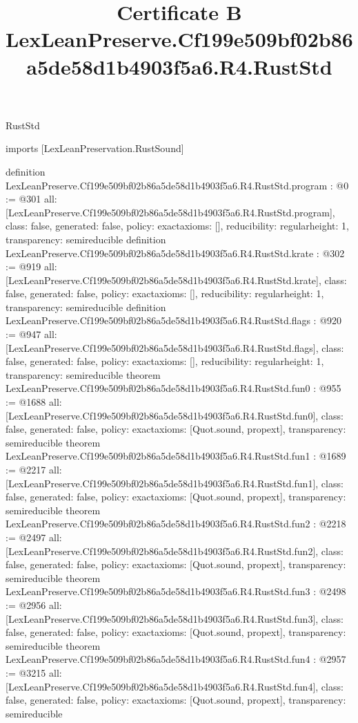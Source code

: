 \begin{lexlean}{RustStd}
\title{Certificate B LexLeanPreserve.Cf199e509bf02b86a5de58d1b4903f5a6.R4.RustStd}
\begin{coremodule}
imports [LexLeanPreservation.RustSound]

definition LexLeanPreserve.Cf199e509bf02b86a5de58d1b4903f5a6.R4.RustStd.program : @0 := @301 {
  all: [LexLeanPreserve.Cf199e509bf02b86a5de58d1b4903f5a6.R4.RustStd.program],
  class: false,
  generated: false,
  policy: exact{axioms: []},
  reducibility: regular{height: 1},
  transparency: semireducible
}
definition LexLeanPreserve.Cf199e509bf02b86a5de58d1b4903f5a6.R4.RustStd.krate : @302 := @919 {
  all: [LexLeanPreserve.Cf199e509bf02b86a5de58d1b4903f5a6.R4.RustStd.krate],
  class: false,
  generated: false,
  policy: exact{axioms: []},
  reducibility: regular{height: 1},
  transparency: semireducible
}
definition LexLeanPreserve.Cf199e509bf02b86a5de58d1b4903f5a6.R4.RustStd.flags : @920 := @947 {
  all: [LexLeanPreserve.Cf199e509bf02b86a5de58d1b4903f5a6.R4.RustStd.flags],
  class: false,
  generated: false,
  policy: exact{axioms: []},
  reducibility: regular{height: 1},
  transparency: semireducible
}
theorem LexLeanPreserve.Cf199e509bf02b86a5de58d1b4903f5a6.R4.RustStd.fun0 : @955 := @1688 {
  all: [LexLeanPreserve.Cf199e509bf02b86a5de58d1b4903f5a6.R4.RustStd.fun0],
  class: false,
  generated: false,
  policy: exact{axioms: [Quot.sound, propext]},
  transparency: semireducible
}
theorem LexLeanPreserve.Cf199e509bf02b86a5de58d1b4903f5a6.R4.RustStd.fun1 : @1689 := @2217 {
  all: [LexLeanPreserve.Cf199e509bf02b86a5de58d1b4903f5a6.R4.RustStd.fun1],
  class: false,
  generated: false,
  policy: exact{axioms: [Quot.sound, propext]},
  transparency: semireducible
}
theorem LexLeanPreserve.Cf199e509bf02b86a5de58d1b4903f5a6.R4.RustStd.fun2 : @2218 := @2497 {
  all: [LexLeanPreserve.Cf199e509bf02b86a5de58d1b4903f5a6.R4.RustStd.fun2],
  class: false,
  generated: false,
  policy: exact{axioms: [Quot.sound, propext]},
  transparency: semireducible
}
theorem LexLeanPreserve.Cf199e509bf02b86a5de58d1b4903f5a6.R4.RustStd.fun3 : @2498 := @2956 {
  all: [LexLeanPreserve.Cf199e509bf02b86a5de58d1b4903f5a6.R4.RustStd.fun3],
  class: false,
  generated: false,
  policy: exact{axioms: [Quot.sound, propext]},
  transparency: semireducible
}
theorem LexLeanPreserve.Cf199e509bf02b86a5de58d1b4903f5a6.R4.RustStd.fun4 : @2957 := @3215 {
  all: [LexLeanPreserve.Cf199e509bf02b86a5de58d1b4903f5a6.R4.RustStd.fun4],
  class: false,
  generated: false,
  policy: exact{axioms: [Quot.sound, propext]},
  transparency: semireducible
}
\end{coremodule}
\end{lexlean}
